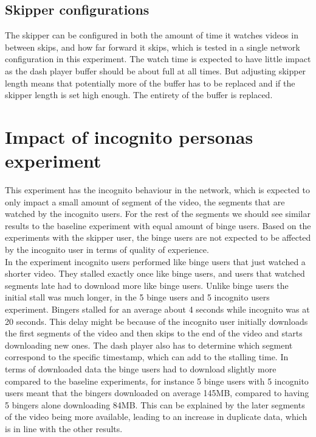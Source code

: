 \subsection{Skipper configurations}
The skipper can be configured in both the amount of time it watches videos in between skips, and how far forward it skips, which is tested in a single network configuration in this experiment. %
The watch time is expected to have little impact as the dash player buffer should be about full at all times. But adjusting skipper length means that potentially more of the buffer has to be replaced and if the skipper length is set high enough. The entirety of the buffer is replaced. %

\section{Impact of incognito personas experiment}
This experiment has the incognito behaviour in the network, which is expected to only impact a small amount of segment of the video, the segments that are watched by the incognito users. For the rest of the segments we should see similar results to the baseline experiment with equal amount of binge users. Based on the experiments with the skipper user, the binge users are not expected to be affected by the incognito user in terms of quality of experience.\\
In the experiment incognito users performed like binge users that just watched a shorter video. They stalled exactly once like binge users, and users that watched segments late had to download more like binge users. %
Unlike binge users the initial stall was much longer, in the 5 binge users and 5 incognito users experiment. Bingers stalled for an average about 4 seconds while incognito was at 20 seconds. This delay might be because of the incognito user initially downloads the first segments of the video and then skips to the end of the video and starts downloading new ones. The dash player also has to determine which segment correspond to the specific timestamp, which can add to the stalling time. %
In terms of downloaded data the binge users had to download slightly more compared to the baseline experiments, for instance 5 binge users with 5 incognito users meant that the bingers downloaded on average 145\acs{MB}, compared to having 5 bingers alone downloading 84\acs{MB}. This can be explained by the later segments of the video being more available, leading to an increase in duplicate data, which is in line with the other results. %

